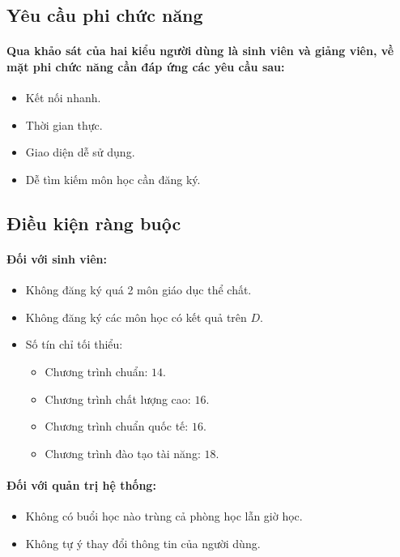 \documentclass{article}
\begin{document}
  \subsection{Yêu cầu phi chức năng}
    \paragraph{
      \textnormal{
        Qua khảo sát của hai kiểu người dùng là sinh viên và giảng viên, về mặt phi chức năng cần đáp ứng các yêu cầu sau:
      }
    }
    \begin{itemize}
      \item Kết nối nhanh.
      \item Thời gian thực.
      \item Giao diện dễ sử dụng.
      \item Dễ tìm kiếm môn học cần đăng ký.
    \end{itemize}
  
  \subsection{Điều kiện ràng buộc}
    
    \paragraph{\textnormal{
      Đối với sinh viên:
    }}
    \begin{itemize}
      \item Không đăng ký quá 2 môn giáo dục thể chất.
      \item Không đăng ký các môn học có kết quả trên $D$.
      \item Số tín chỉ tối thiểu:
      \begin{itemize}
        \item Chương trình chuẩn: $14$.
        \item Chương trình chất lượng cao: $16$.
        \item Chương trình chuẩn quốc tế: $16$.
        \item Chương trình đào tạo tài năng: $18$.
      \end{itemize}
    \end{itemize}

    \paragraph{\textnormal{
      Đối với quản trị hệ thống:
    }}
    \begin{itemize}
      \item Không có buổi học nào trùng cả phòng học lẫn giờ học.
      \item Không tự ý thay đổi thông tin của người dùng.
    \end{itemize}
\end{document}
